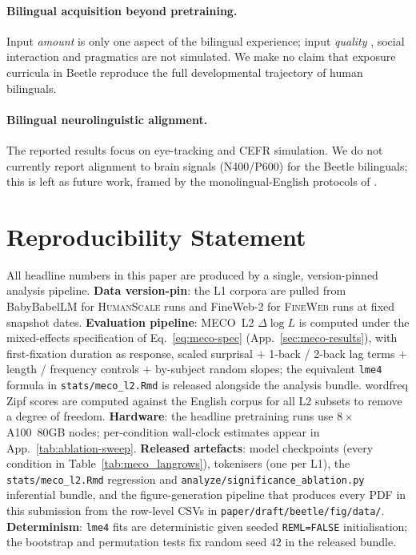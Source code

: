 \documentclass[11pt]{article}
\begin{document}
\paragraph{Bilingual acquisition beyond pretraining.} Input \emph{amount} is only one aspect of the bilingual experience; input \emph{quality} \citep{luk2013bilingualism, carroll2017exposure, de2017role, paradis2023sources}, social interaction and pragmatics are not simulated. We make no claim that exposure curricula in Beetle reproduce the full developmental trajectory of human bilinguals.

\paragraph{Bilingual neurolinguistic alignment.} The reported results focus on eye-tracking and CEFR simulation. We do not currently report alignment to brain signals (N400/P600) for the Beetle bilinguals; this is left as future work, framed by the monolingual-English protocols of \citet{michaelov2026better}.


\section{Reproducibility Statement}\label{sec:reproducibility}

All headline numbers in this paper are produced by a single, version-pinned analysis pipeline. \textbf{Data version-pin}: the L1 corpora are pulled from BabyBabelLM \citep{jumelet2025babybabellmmultilingualbenchmarkdevelopmentally} for \textsc{HumanScale} runs and FineWeb-2 \citep{penedo2025fineweb2} for \textsc{FineWeb} runs at fixed snapshot dates. \textbf{Evaluation pipeline}: MECO~L2 $\Delta\log L$ is computed under the mixed-effects specification of Eq.~\ref{eq:meco-spec} (App.~\ref{sec:meco-results}), with first-fixation duration as response, scaled surprisal $+$ 1-back / 2-back lag terms $+$ length / frequency controls $+$ by-subject random slopes; the equivalent \texttt{lme4} formula in \texttt{stats/meco\_l2.Rmd} is released alongside the analysis bundle. wordfreq Zipf scores are computed against the English corpus for all L2 subsets to remove a degree of freedom. \textbf{Hardware}: the headline pretraining runs use $8\times$ A100~80GB nodes; per-condition wall-clock estimates appear in App.~\ref{tab:ablation-sweep}. \textbf{Released artefacts}: model checkpoints (every condition in Table~\ref{tab:meco_langrows}), tokenisers (one per L1), the \texttt{stats/meco\_l2.Rmd} regression and \texttt{analyze/significance\_ablation.py} inferential bundle, and the figure-generation pipeline that produces every PDF in this submission from the row-level CSVs in \texttt{paper/draft/beetle/fig/data/}. \textbf{Determinism}: \texttt{lme4} fits are deterministic given seeded \texttt{REML=FALSE} initialisation; the bootstrap and permutation tests fix random seed $42$ in the released bundle.
\end{document}
